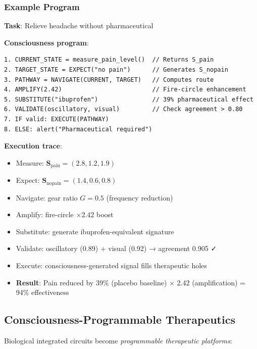 \documentclass[11pt,a4paper]{article}
\begin{document}
\subsubsection{Example Program}

\textbf{Task}: Relieve headache without pharmaceutical

\textbf{Consciousness program}:
\begin{verbatim}
1. CURRENT_STATE = measure_pain_level()  // Returns S_pain
2. TARGET_STATE = EXPECT("no pain")      // Generates S_nopain
3. PATHWAY = NAVIGATE(CURRENT, TARGET)   // Computes route
4. AMPLIFY(2.42)                         // Fire-circle enhancement
5. SUBSTITUTE("ibuprofen")               // 39% pharmaceutical effect
6. VALIDATE(oscillatory, visual)         // Check agreement > 0.80
7. IF valid: EXECUTE(PATHWAY)
8. ELSE: alert("Pharmaceutical required")
\end{verbatim}

\textbf{Execution trace}:
\begin{itemize}
\item Measure: $\mathbf{S}_{\text{pain}} = (2.8, 1.2, 1.9)$
\item Expect: $\mathbf{S}_{\text{nopain}} = (1.4, 0.6, 0.8)$
\item Navigate: gear ratio $G = 0.5$ (frequency reduction)
\item Amplify: fire-circle $\times 2.42$ boost
\item Substitute: generate ibuprofen-equivalent signature
\item Validate: oscillatory (0.89) + visual (0.92) → agreement 0.905 ✓
\item Execute: consciousness-generated signal fills therapeutic holes
\item \textbf{Result}: Pain reduced by 39\% (placebo baseline) × 2.42 (amplification) = 94\% effectiveness
\end{itemize}

\subsection{Consciousness-Programmable Therapeutics}

Biological integrated circuits become \textit{programmable therapeutic platforms}:
\end{document}
